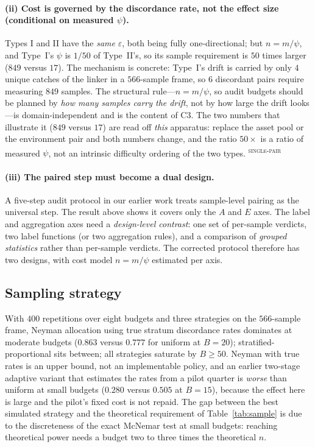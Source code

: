 \documentclass{article}
\newcommand{\evtag}[1]{\textsuperscript{\textsc{#1}}}
\begin{document}
\paragraph{(ii) Cost is governed by the discordance rate, not the effect size (conditional on measured
$\psi$).} Types I and II have the
\emph{same} $\varepsilon$, both being fully one-directional; but $n=m/\psi$, and Type~I's $\psi$ is $1/50$
of Type~II's, so its sample requirement is $50$ times larger ($849$ versus $17$). The mechanism is
concrete: Type~I's drift is carried by only $4$ unique catches of the linker in a $566$-sample frame, so $6$
discordant pairs require measuring $849$ samples. The structural rule---$n=m/\psi$, so audit budgets should
be planned by \emph{how many samples carry the drift}, not by how large the drift looks---is
domain-independent and is the content of C3. The two numbers that illustrate it ($849$ versus $17$) are read
off \emph{this} apparatus: replace the asset pool or the environment pair and both numbers change, and the
ratio $50\times$ is a ratio of measured $\psi$, not an intrinsic difficulty ordering of the two types.
\evtag{single-pair}

\paragraph{(iii) The paired step must become a dual design.} A five-step audit protocol in our earlier work
treats sample-level pairing as the universal step. The result above shows it covers only the $A$ and $E$
axes. The label and aggregation axes need a \emph{design-level contrast}: one set of per-sample verdicts,
two label functions (or two aggregation rules), and a comparison of \emph{grouped statistics} rather than
per-sample verdicts. The corrected protocol therefore has two designs, with cost model $n=m/\psi$ estimated
per axis.

\subsection{Sampling strategy}
\label{sec:strategy}

With $400$ repetitions over eight budgets and three strategies on the $566$-sample frame, Neyman allocation
using true stratum discordance rates dominates at moderate budgets ($0.863$ versus $0.777$ for uniform at
$B=20$); stratified-proportional sits between; all strategies saturate by $B\ge50$. Neyman with true rates
is an upper bound, not an implementable policy, and an earlier two-stage adaptive variant that estimates the
rates from a pilot quarter is \emph{worse} than uniform at small budgets ($0.280$ versus $0.505$ at
$B=15$), because the effect here is large and the pilot's fixed cost is not repaid. The gap between the best
simulated strategy and the theoretical requirement of Table~\ref{tab:sample} is due to the discreteness of
the exact McNemar test at small budgets: reaching theoretical power needs a budget two to three times the
theoretical $n$.
\end{document}
